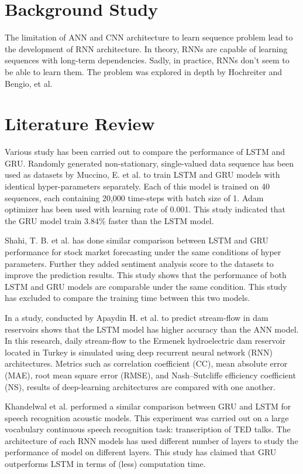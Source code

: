 \section{Background Study}
The limitation of ANN and CNN architecture to learn sequence problem lead to the development of RNN architecture. In theory, RNNs are capable of learning sequences with long-term dependencies. Sadly, in practice, RNNs don’t seem to be able to learn them. The problem was explored in depth by Hochreiter\cite{hochreiter} and Bengio, et al.\cite{Bengio_2013}

\section{Literature Review}
Various study has been carried out to compare the performance of LSTM and GRU. Randomly generated non-stationary, single-valued data sequence has been used as datasets by Muccino, E. et al. \cite{eric2019} to train LSTM and GRU models with identical hyper-parameters separately. Each of this model is trained on 40 sequences, each containing 20,000 time-steps with batch size of 1. Adam optimizer has been used with learning rate of 0.001. This study indicated that the GRU model train 3.84\% faster than the LSTM model.

Shahi, T. B. et al.\cite{shahi2020stock} has done similar comparison between LSTM and GRU performance for stock market forecasting under the same conditions of hyper parameters. Further they added sentiment analysis score to the datasets to improve the prediction results. This study shows that the performance of both LSTM and GRU models are comparable under the same condition. This study has excluded to compare the training time between this two models.

In a study, conducted by Apaydin H. et al. \cite{reservoir} to predict stream-flow in dam reservoirs shows that the LSTM model has higher accuracy than the ANN model. In this research, daily stream-flow to the Ermenek hydroelectric dam reservoir located in Turkey is simulated using deep recurrent neural network (RNN) architectures. Metrics such as  correlation coefficient (CC), mean absolute error (MAE), root mean square error (RMSE), and Nash–Sutcliffe efficiency coefficient (NS), results of deep-learning architectures are compared with one another.

Khandelwal et al.\cite{khandelwal:hal-01633254} performed a similar comparison between GRU and LSTM for speech recognition acoustic models. This experiment was carried out on a large vocabulary continuous speech recognition task: transcription of TED talks. The architecture of each RNN models has used different number of layers to study the performance of model on different layers. This study has claimed that GRU outperforms LSTM in terms of (less) computation time.
